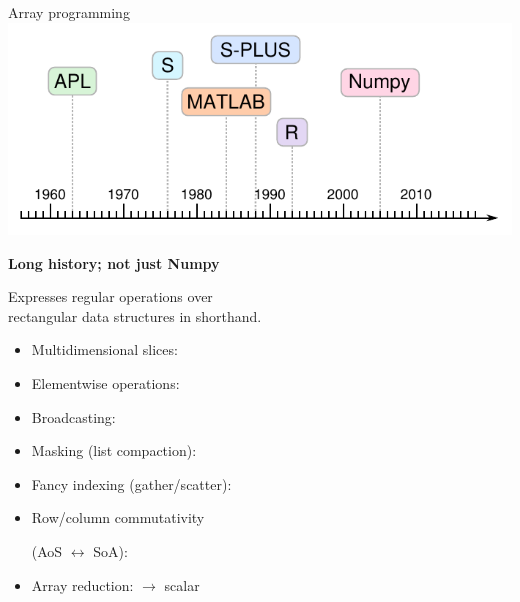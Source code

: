 \documentclass[aspectratio=169]{beamer}
\begin{document}
\begin{frame}[fragile]{Array programming}
\vspace{0.2 cm}
\hfill \includegraphics[height=2.75 cm]{apl-timeline.pdf}

\vspace{-2.15 cm}
{\bf\large Long history; not just Numpy}

\vspace{0.5 cm}
Expresses regular operations over \\ rectangular data structures in shorthand.

\vspace{0.25 cm}
\begin{itemize}\setlength{\itemsep}{0.15 cm}
\item<2-> Multidimensional slices: 
\item<3-> Elementwise operations: 
\item<4-> Broadcasting: 
\item<5-> Masking (list compaction): 
\item<6-> Fancy indexing (gather/scatter): 
\item<7-> Row/column commutativity 

(AoS $\leftrightarrow$ SoA): 
\item<8-> Array reduction:  $\to$ scalar
\end{itemize}
\end{frame}
\end{document}
